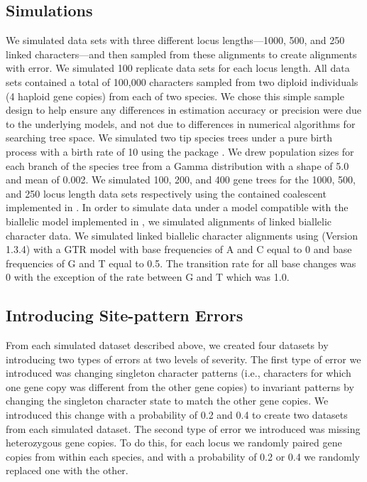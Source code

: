 \subsection{Simulations}
We simulated data sets with three different locus lengths---1000, 500, and 250 
linked characters---and then sampled from these alignments to create alignments 
with  error. We simulated 100 replicate data sets for each locus length. 
All data sets contained a total of 100,000 
characters sampled from two diploid individuals (4 haploid gene copies) from each 
of two species. We chose this simple sample design to help ensure any 
differences in estimation accuracy or precision were due to the underlying 
models, and not due to differences in numerical algorithms for searching tree 
space.  We simulated two tip species trees under a pure birth process with a 
birth rate of 10 using the \python package
\dendropy
\citep[Version 4.40; dev branch commit eb69003;][]{Dendropy}.  
We drew population sizes for each branch of the species tree from a Gamma 
distribution with a shape of 5.0 and mean of 0.002. We simulated 100, 200, and 
400 gene trees for the 1000, 500, and 250 locus length data sets respectively 
using the contained coalescent implemented in \dendropy. In order to 
simulate data under a model compatible with the biallelic model implemented in 
\ecoevolity, we simulated alignments of linked biallelic character data. 
We simulated linked biallelic character alignments using
\seqgen (Version 1.3.4)
\citep{@rambautSeqGenApplicationMonte1997}
with a GTR model with base frequencies of A and C equal to 0 and base 
frequencies of G and T equal to 0.5. The transition rate for all base changes was 
0 with the exception of the rate between G and T which was 1.0. 

\subsection{Introducing Site-pattern Errors}
From each simulated dataset described above, we created four datasets by 
introducing two types of errors at two levels of severity. The first type of 
error we introduced was changing singleton character patterns (i.e., characters 
for which one gene copy was different from the other gene copies) to invariant 
patterns by changing the singleton character state to match the other gene 
copies. We introduced this change with a probability of 0.2 and 0.4 to create 
two datasets from each simulated dataset. The second type of error we introduced 
was missing heterozygous gene copies. To do this, for each locus 
we randomly paired gene copies from within each species, and with a probability 
of 0.2 or 0.4 we randomly replaced one with the other. 

